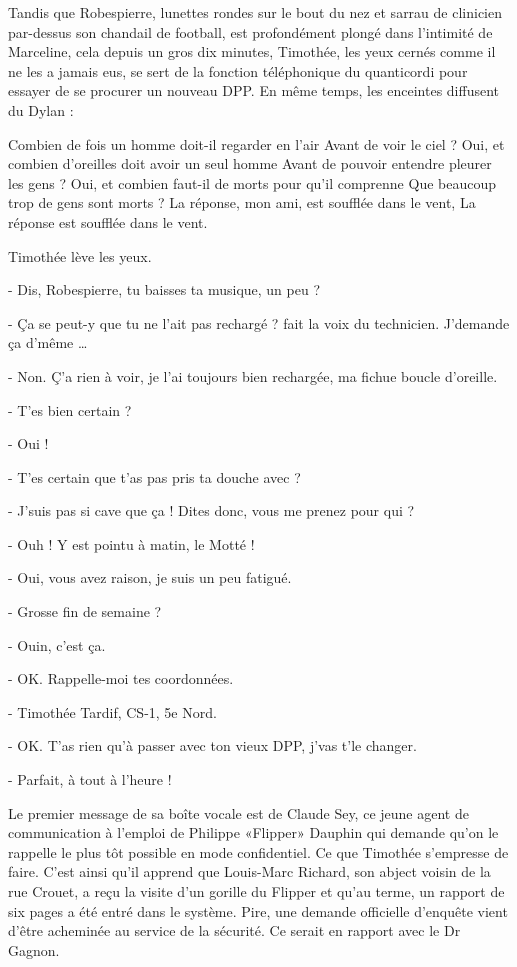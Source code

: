 Tandis que Robespierre, lunettes rondes sur le bout du nez et sarrau de clinicien par-dessus son chandail de football, est profondément plongé dans l’intimité de Marceline, cela depuis un gros dix minutes, Timothée, les yeux cernés comme il ne les a jamais eus, se sert de la fonction téléphonique du quanticordi pour essayer de se procurer un nouveau DPP. En même temps, les enceintes diffusent du Dylan :

    Combien de fois un homme doit-il regarder en l’air
    Avant de voir le ciel ?
    Oui, et combien d’oreilles doit avoir un seul homme
    Avant de pouvoir entendre pleurer les gens ?
    Oui, et combien faut-il de morts pour qu’il comprenne
    Que beaucoup trop de gens sont morts ?
    La réponse, mon ami, est soufflée dans le vent,
    La réponse est soufflée dans le vent.

Timothée lève les yeux.

- Dis, Robespierre, tu baisses ta musique, un peu ?

- Ça se peut-y que tu ne l’ait pas rechargé ? fait la voix du technicien. J’demande ça d’même …

- Non. Ç’a rien à voir, je l’ai toujours bien rechargée, ma fichue boucle d’oreille.

- T’es bien certain ?

- Oui !

- T’es certain que t’as pas pris ta douche avec ?

- J’suis pas si cave que ça ! Dites donc, vous me prenez pour qui ?

- Ouh ! Y est pointu à matin, le Motté !

- Oui, vous avez raison, je suis un peu fatigué.

- Grosse fin de semaine ?

- Ouin, c’est ça.

- OK. Rappelle-moi tes coordonnées.

- Timothée Tardif, CS-1, 5e Nord.

- OK. T’as rien qu’à passer avec ton vieux DPP, j’vas t’le changer.

- Parfait, à tout à l’heure !

Le premier message de sa boîte vocale est de Claude Sey, ce jeune agent de communication à l’emploi de Philippe «Flipper» Dauphin qui demande qu’on le rappelle le plus tôt possible en mode confidentiel. Ce que Timothée s’empresse de faire. C’est ainsi qu’il apprend que Louis-Marc Richard, son abject voisin de la rue Crouet, a reçu la visite d’un gorille du Flipper et qu’au terme, un rapport de six pages a été entré dans le système. Pire, une demande officielle d’enquête vient d’être acheminée au service de la sécurité. Ce serait en rapport avec le Dr Gagnon.

